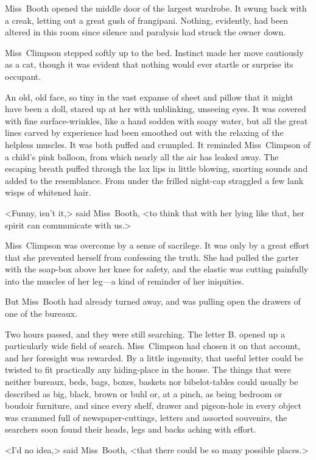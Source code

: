 Miss~Booth opened the middle door of the largest wardrobe. It swung back with a creak, letting out a great gush of frangipani. Nothing, evidently, had been altered in this room since silence and paralysis had struck the owner down.

Miss~Climpson stepped softly up to the bed. Instinct made her move cautiously as a cat, though it was evident that nothing would ever startle or surprise its occupant.

An old, old face, so tiny in the vast expanse of sheet and pillow that it might have been a doll, stared up at her with unblinking, unseeing eyes. It was covered with fine surface-wrinkles, like a hand sodden with soapy water, but all the great lines carved by experience had been smoothed out with the relaxing of the helpless muscles. It was both puffed and crumpled. It reminded Miss~Climpson of a child's pink balloon, from which nearly all the air has leaked away. The escaping breath puffed through the lax lips in little blowing, snorting sounds and added to the resemblance. From under the frilled night-cap straggled a few lank wisps of whitened hair.

<Funny, isn't it,> said Miss~Booth, <to think that with her lying like that, her spirit can communicate with us.>

Miss~Climpson was overcome by a sense of sacrilege. It was only by a great effort that she prevented herself from confessing the truth. She had pulled the garter with the soap-box above her knee for safety, and the elastic was cutting painfully into the muscles of her leg—a kind of reminder of her iniquities.

But Miss~Booth had already turned away, and was pulling open the drawers of one of the bureaux.

Two hours passed, and they were still searching. The letter B. opened up a particularly wide field of search. Miss~Climpson had chosen it on that account, and her foresight was rewarded. By a little ingenuity, that useful letter could be twisted to fit practically any hiding-place in the house. The things that were neither bureaux, beds, bags, boxes, baskets nor bibelot-tables could usually be described as big, black, brown or buhl or, at a pinch, as being bedroom or boudoir furniture, and since every shelf, drawer and pigeon-hole in every object was crammed full of newspaper-cuttings, letters and assorted souvenirs, the searchers soon found their heads, legs and backs aching with effort.

<I'd no idea,> said Miss~Booth, <that there could be so many possible places.>

